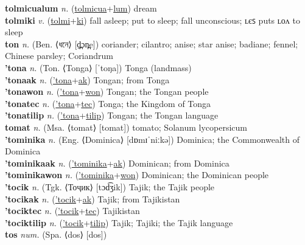 \textbf{tolmicualum} \textit{n.} (\hyperref[tolmicua]{tolmicua}+\hyperref[lum]{lum})
dream \label{tolmicualum} \\
\textbf{tolmiki} \textit{v.} (\hyperref[tolmi]{tolmi}+\hyperref[ki]{ki})
fall asleep; put to sleep; fall unconscious; ʟєꜱ puts ʟᴏᴧ to sleep \label{tolmiki} \\
\textbf{ton} \textit{n.} (Ben. ⟨ধনে⟩ [d̪̤ɔn̪e])
coriander; cilantro; anise; star anise; badiane; fennel; Chinese parsley; Coriandrum \label{ton} \\
\textbf{'tona} \textit{n.} (Ton. ⟨Tonga⟩ [ˈtoŋa])
Tonga (landmass) \label{'tona} \\
\textbf{'tonaak} \textit{n.} (\hyperref['tona]{'tona}+\hyperref[ak]{ak})
Tongan; from Tonga \label{'tonaak} \\
\textbf{'tonawon} \textit{n.} (\hyperref['tona]{'tona}+\hyperref[won]{won})
Tongan; the Tongan people \label{'tonawon} \\
\textbf{'tonatec} \textit{n.} (\hyperref['tona]{'tona}+\hyperref[tec]{tec})
Tonga; the Kingdom of Tonga \label{'tonatec} \\
\textbf{'tonatilip} \textit{n.} (\hyperref['tona]{'tona}+\hyperref[tilip]{tilip})
Tongan; the Tongan language \label{'tonatilip} \\
\textbf{tomat} \textit{n.} (Msa. ⟨tomat⟩ [tomat])
tomato; Solanum lycopersicum \label{tomat} \\
\textbf{'tominika} \textit{n.} (Eng. ⟨Dominica⟩ [dɒmɪˈniːkə])
Dominica; the Commonwealth of Dominica \label{'tominika} \\
\textbf{'tominikaak} \textit{n.} (\hyperref['tominika]{'tominika}+\hyperref[ak]{ak})
Dominican; from Dominica \label{'tominikaak} \\
\textbf{'tominikawon} \textit{n.} (\hyperref['tominika]{'tominika}+\hyperref[won]{won})
Dominican; the Dominican people \label{'tominikawon} \\
\textbf{'tocik} \textit{n.} (Tgk. ⟨Тоҷик⟩ [tɔd͡ʒik])
Tajik; the Tajik people \label{'tocik} \\
\textbf{'tocikak} \textit{n.} (\hyperref['tocik]{'tocik}+\hyperref[ak]{ak})
Tajik; from Tajikistan \label{'tocikak} \\
\textbf{'tociktec} \textit{n.} (\hyperref['tocik]{'tocik}+\hyperref[tec]{tec})
Tajikistan \label{'tociktec} \\
\textbf{'tociktilip} \textit{n.} (\hyperref['tocik]{'tocik}+\hyperref[tilip]{tilip})
Tajik; Tajiki; the Tajik language \label{'tociktilip} \\
\textbf{tos} \textit{num.} (Spa. ⟨dos⟩ [dos])
